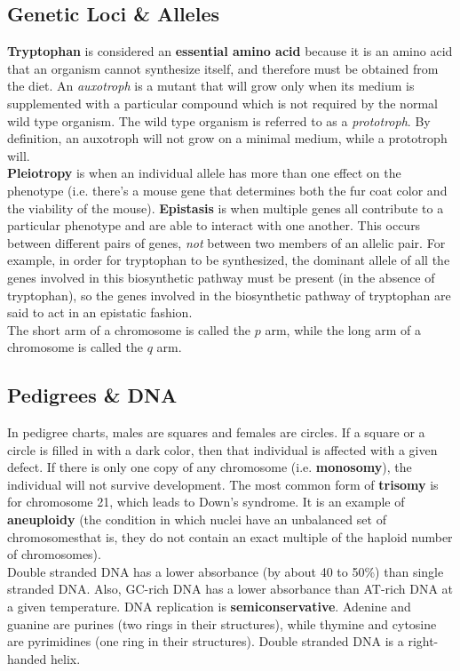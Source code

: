 \documentclass{article}
\theoremstyle{plain}%
\theoremstyle{definition}
\theoremstyle{remark}
\begin{document}
\subsection{Genetic Loci \& Alleles}
\textbf{Tryptophan} is considered an \textbf{essential amino acid} because it is an amino acid that an organism cannot synthesize itself, and therefore must be obtained from the diet. An \textit{auxotroph} is a mutant that will grow only when its medium is supplemented with a particular compound which is not required by the normal wild type organism. The wild type organism is referred to as a \textit{prototroph}. By definition, an auxotroph will not grow on a minimal medium, while a prototroph will. \\
\indent \textbf{Pleiotropy} is when an individual allele has more than one effect on the phenotype (i.e. there's a mouse gene that determines both the fur coat color and the viability of the mouse). \textbf{Epistasis} is when multiple genes all contribute to a particular phenotype and are able to interact with one another. This occurs between different pairs of genes, \textit{not} between two members of an allelic pair. For example, in order for tryptophan to be synthesized, the dominant allele of all the genes involved in this biosynthetic pathway must be present (in the absence of tryptophan), so the genes involved in the biosynthetic pathway of tryptophan are said to act in an epistatic fashion.\\
\indent The short arm of a chromosome is called the $p$ arm, while the long arm of a chromosome is called the $q$ arm. 

\subsection{Pedigrees \& DNA}
In pedigree charts, males are squares and females are circles. If a square or a circle is filled in with a dark color, then that individual is affected with a given defect. If there is only one copy of any chromosome (i.e. \textbf{monosomy}), the individual will not survive development. The most common form of \textbf{trisomy} is for chromosome 21, which leads to Down's syndrome. It is an example of \textbf{aneuploidy} (the condition in which nuclei have an unbalanced set of chromosomes\textemdash that is, they do not contain an exact multiple of the haploid number of chromosomes). \\
\indent Double stranded DNA has a lower absorbance (by about 40 to 50\%) than single stranded DNA. Also, GC-rich DNA has a lower absorbance than AT-rich DNA at a given temperature. DNA replication is \textbf{semiconservative}. Adenine and guanine are purines (two rings in their structures), while thymine and cytosine are pyrimidines (one ring in their structures). Double stranded DNA is a right-handed helix.
\end{document}
